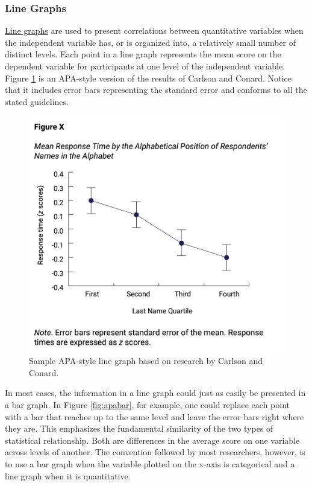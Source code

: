 \documentclass[
]{krantz}
\begin{document}
\hypertarget{line-graphs}{%
\subsubsection*{Line Graphs}\label{line-graphs}}


\protect\hyperlink{line-graph}{Line graphs} are used to present correlations between quantitative variables when the independent variable has, or is organized into, a relatively small number of distinct levels. Each point in a line graph represents the mean score on the dependent variable for participants at one level of the independent variable. Figure \ref{fig:apaline} is an APA-style version of the results of Carlson and Conard. Notice that it includes error bars representing the standard error and conforms to all the stated guidelines.

\begin{figure}

{\centering \includegraphics[width=0.6\linewidth]{images/ch12/apaline} 

}

\caption{Sample APA-style line graph based on research by Carlson and Conard.}\label{fig:apaline}
\end{figure}

In most cases, the information in a line graph could just as easily be presented in a bar graph. In Figure \ref{fig:apabar}, for example, one could replace each point with a bar that reaches up to the same level and leave the error bars right where they are. This emphasizes the fundamental similarity of the two types of statistical relationship. Both are differences in the average score on one variable across levels of another. The convention followed by most researchers, however, is to use a bar graph when the variable plotted on the x-axis is categorical and a line graph when it is quantitative.
\end{document}
